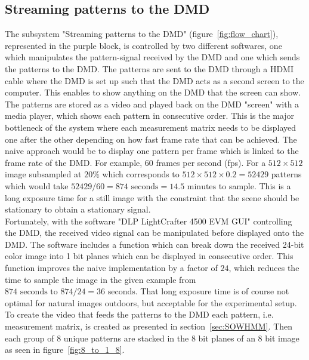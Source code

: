\subsection{Streaming patterns to the DMD}
\label{sec:stream_dmd}
The subsystem "Streaming patterns to the DMD" (figure~\ref{fig:flow_chart}), represented in the purple block, is controlled by two different softwares, one which manipulates the pattern-signal received by the DMD and one which sends the patterns to the DMD. The patterns are sent to the DMD through a HDMI cable where the DMD is set up such that the DMD acts as a second screen to the computer. This enables to show anything on the DMD that the screen can show. The patterns are stored as a video and played back on the DMD "screen" with a media player, which shows each pattern in consecutive order. This is the major bottleneck of the system where each measurement matrix needs to be displayed one after the other depending on how fast frame rate that can be achieved. The naive approach would be to display one pattern per frame which is linked to the frame rate of the DMD. For example, 60 frames per second (fps). For a $512\times 512$ image subsampled at $20\%$ which corresponds to $512\times 512 \times 0.2 = 52429$ patterns which would take $52429/60 = 874 \text{ seconds} = 14.5 \text{ minutes}$ to sample. This is a long exposure time for a still image with the constraint that the scene should be stationary to obtain a stationary signal.\\[0.1in]

Fortunately, with the software "DLP LightCrafter 4500 EVM GUI" controlling the DMD, the received video signal can be manipulated before displayed onto the DMD. The software includes a function which can break down the received 24-bit color image into 1 bit planes which can be displayed in consecutive order. This function improves the naive implementation by a factor of $24$, which reduces the time to sample the image in the given example from $874 \text{ seconds to } 874/24 = 36 \text{ seconds}$. That long exposure time is of course not optimal for natural images outdoors, but acceptable for the experimental setup.\\[0.1in]     


To create the video that feeds the patterns to the DMD each pattern,  i.e. measurement matrix, is created as presented in section~\ref{sec:SOWHMM}. Then each group of 8 unique patterns are stacked in the 8 bit planes of an 8 bit image as seen in figure~\ref{fig:8_to_1_8}.

